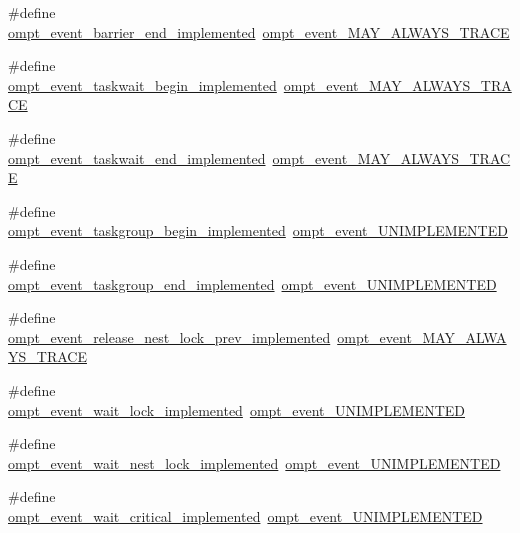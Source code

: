 \begin{DoxyCompactItemize}
\#define \hyperlink{ompt-event-specific_8h_a5fd5a81cfe38123422d94d6b6973f1be}{ompt\-\_\-event\-\_\-barrier\-\_\-end\-\_\-implemented}~\hyperlink{ompt-event-specific_8h_a81d63d53ff090774864cdd033effe56e}{ompt\-\_\-event\-\_\-\-M\-A\-Y\-\_\-\-A\-L\-W\-A\-Y\-S\-\_\-\-T\-R\-A\-C\-E}
\item 
\#define \hyperlink{ompt-event-specific_8h_afa788ee7beee2a97a19adeca23b3865c}{ompt\-\_\-event\-\_\-taskwait\-\_\-begin\-\_\-implemented}~\hyperlink{ompt-event-specific_8h_a81d63d53ff090774864cdd033effe56e}{ompt\-\_\-event\-\_\-\-M\-A\-Y\-\_\-\-A\-L\-W\-A\-Y\-S\-\_\-\-T\-R\-A\-C\-E}
\item 
\#define \hyperlink{ompt-event-specific_8h_a4810dc839ce06ed6245eb3bab1d82a49}{ompt\-\_\-event\-\_\-taskwait\-\_\-end\-\_\-implemented}~\hyperlink{ompt-event-specific_8h_a81d63d53ff090774864cdd033effe56e}{ompt\-\_\-event\-\_\-\-M\-A\-Y\-\_\-\-A\-L\-W\-A\-Y\-S\-\_\-\-T\-R\-A\-C\-E}
\item 
\#define \hyperlink{ompt-event-specific_8h_ac176607a57eb9561636a387337053475}{ompt\-\_\-event\-\_\-taskgroup\-\_\-begin\-\_\-implemented}~\hyperlink{ompt-event-specific_8h_a5719430a79b410eee8d68fcec0fbf8f2}{ompt\-\_\-event\-\_\-\-U\-N\-I\-M\-P\-L\-E\-M\-E\-N\-T\-E\-D}
\item 
\#define \hyperlink{ompt-event-specific_8h_a2405139752aba688ea3be729bcc6adcf}{ompt\-\_\-event\-\_\-taskgroup\-\_\-end\-\_\-implemented}~\hyperlink{ompt-event-specific_8h_a5719430a79b410eee8d68fcec0fbf8f2}{ompt\-\_\-event\-\_\-\-U\-N\-I\-M\-P\-L\-E\-M\-E\-N\-T\-E\-D}
\item 
\#define \hyperlink{ompt-event-specific_8h_abfa449e7631b118d924b7e4340fa30c7}{ompt\-\_\-event\-\_\-release\-\_\-nest\-\_\-lock\-\_\-prev\-\_\-implemented}~\hyperlink{ompt-event-specific_8h_a81d63d53ff090774864cdd033effe56e}{ompt\-\_\-event\-\_\-\-M\-A\-Y\-\_\-\-A\-L\-W\-A\-Y\-S\-\_\-\-T\-R\-A\-C\-E}
\item 
\#define \hyperlink{ompt-event-specific_8h_a195e2a9c96ca51f746ef3e4497951ff7}{ompt\-\_\-event\-\_\-wait\-\_\-lock\-\_\-implemented}~\hyperlink{ompt-event-specific_8h_a5719430a79b410eee8d68fcec0fbf8f2}{ompt\-\_\-event\-\_\-\-U\-N\-I\-M\-P\-L\-E\-M\-E\-N\-T\-E\-D}
\item 
\#define \hyperlink{ompt-event-specific_8h_a288449a38cf490ea8f7f406dec34af0f}{ompt\-\_\-event\-\_\-wait\-\_\-nest\-\_\-lock\-\_\-implemented}~\hyperlink{ompt-event-specific_8h_a5719430a79b410eee8d68fcec0fbf8f2}{ompt\-\_\-event\-\_\-\-U\-N\-I\-M\-P\-L\-E\-M\-E\-N\-T\-E\-D}
\item 
\#define \hyperlink{ompt-event-specific_8h_aa1fb38801e586b0f641c210b426e664c}{ompt\-\_\-event\-\_\-wait\-\_\-critical\-\_\-implemented}~\hyperlink{ompt-event-specific_8h_a5719430a79b410eee8d68fcec0fbf8f2}{ompt\-\_\-event\-\_\-\-U\-N\-I\-M\-P\-L\-E\-M\-E\-N\-T\-E\-D}

\end{DoxyCompactItemize}
